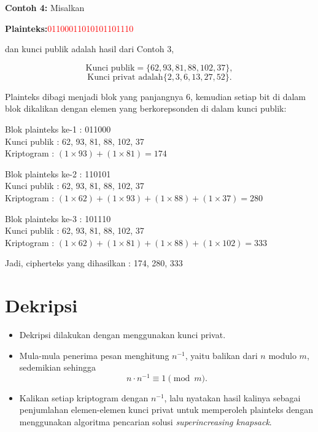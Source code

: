 \documentclass{article}
\begin{document}
\newpage


\textbf{Contoh 4:} Misalkan

\textbf{Plainteks:}\textcolor{red}{01100011010101101110}

dan kunci publik adalah hasil dari Contoh 3,

\[ \text{Kunci publik} = \{62, 93, 81, 88, 102, 37\}, \]
\[ \text{Kunci privat adalah} \{2, 3, 6, 13, 27, 52\}. \]

Plainteks dibagi menjadi blok yang panjangnya 6, kemudian setiap bit di dalam blok dikalikan dengan elemen yang berkorepsonden di dalam kunci publik:

\newpage


Blok plainteks ke-1 : 011000 \\
Kunci publik : 62, 93, 81, 88, 102, 37 \\
Kriptogram : $(1 \times 93) + (1 \times 81) = 174$

\vspace{5mm}

Blok plainteks ke-2 : 110101 \\
Kunci publik : 62, 93, 81, 88, 102, 37 \\
Kriptogram : $(1 \times 62) + (1 \times 93) + (1 \times 88) + (1 \times 37) = 280$

\vspace{5mm}

Blok plainteks ke-3 : 101110 \\
Kunci publik : 62, 93, 81, 88, 102, 37 \\
Kriptogram : $(1 \times 62) + (1 \times 81) + (1 \times 88) + (1 \times 102) = 333$

\vspace{5mm}

Jadi, cipherteks yang dihasilkan : 174, 280, 333

\newpage


\section*{Dekripsi}

\begin{itemize}
    \item Dekripsi dilakukan dengan menggunakan kunci privat.
    \item Mula-mula penerima pesan menghitung $n^{-1}$, yaitu balikan dari $n$ modulo $m$, sedemikian sehingga
    \[ n \cdot n^{-1} \equiv 1 \pmod{m}. \]
    \item Kalikan setiap kriptogram dengan $n^{-1}$, lalu nyatakan hasil kalinya sebagai penjumlahan elemen-elemen kunci privat untuk memperoleh plainteks dengan menggunakan algoritma pencarian solusi \textit{superincreasing knapsack}.
\end{itemize}
\end{document}
